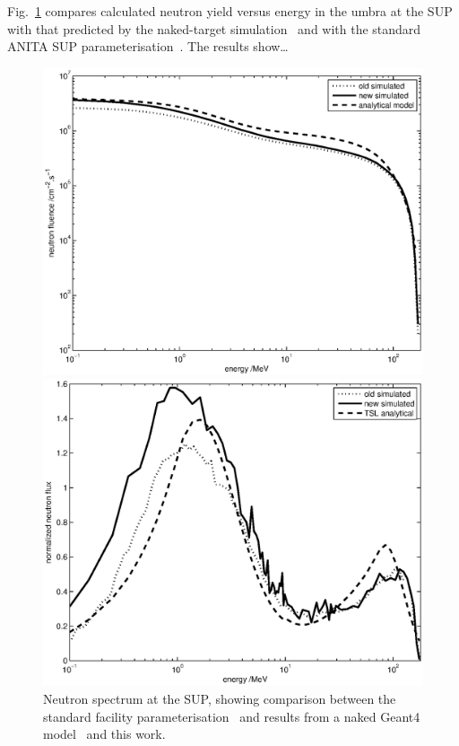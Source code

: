 \documentclass[11pt,a4paper]{IEEEtran}
\let\MYoriglatexcaption\caption
\renewcommand{\caption}[2][\relax]{\MYoriglatexcaption[#2]{#2}}
\begin{document}
Fig.~\ref{fig:SUPSpectraComparison} compares calculated neutron yield versus energy in the umbra at the SUP with that predicted by the naked-target simulation~\cite{Platt13} and with the standard ANITA SUP parameterisation~\cite{Prokofiev2009}.
The results show\ldots
{}

\begin{figure}[t]
    \begin{minipage}{\columnwidth}
        \centering
        \includegraphics[width=0.9\columnwidth]{SUPComparedIFluxRADECS.eps}
    \end{minipage}
    \begin{minipage}{\columnwidth}
        \centering
        \includegraphics[width=0.9\columnwidth]{SUPNormalisedRADECS.eps}
    \end{minipage}
	\caption{
        Neutron spectrum at the SUP, showing comparison between the standard facility parameterisation~\cite{Prokofiev2009} and results from a naked Geant4 model~\cite{Platt13} and this work.
    }
	\label{fig:SUPSpectraComparison}
\end{figure}
\end{document}
